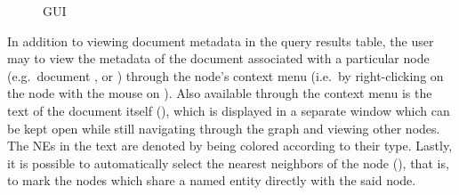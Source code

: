 \begin{figure}[h]
\centering
\caption{GUI}
\end{figure}

In addition to viewing document metadata in the query results table, the user may to view the metadata of the document associated with a particular node (e.g.\ document ,  or ) through the node's context menu (i.e.\ by right-clicking on the node with the mouse on ). Also available through the context menu is the text of the document itself (), which is displayed in a separate window which can be kept open while still navigating through the graph and viewing other nodes. The NEs in the text are denoted by being colored according to their type. Lastly, it is possible to automatically select the nearest neighbors of the node (), that is, to mark the nodes which share a named entity directly with the said node.